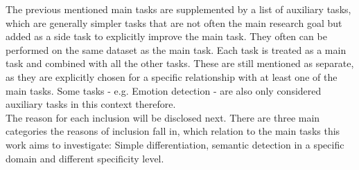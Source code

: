 	The previous mentioned main tasks are supplemented by a list of auxiliary tasks, which are generally simpler tasks that are not often the main research goal but added as a side task to explicitly improve the main task. They often can be performed on the same dataset as the main task. Each task is treated as a main task and combined with all the other tasks. These are still mentioned as separate, as they are explicitly chosen for a specific relationship with at least one of the main tasks. Some tasks - e.g. Emotion detection - are also only considered auxiliary tasks in this context therefore. \\
	
	The reason for each inclusion will be disclosed next. There are three main categories the reasons of inclusion fall in, which relation to the main tasks this work aims to investigate: Simple differentiation, semantic detection in a specific domain and different specificity level. 
	

